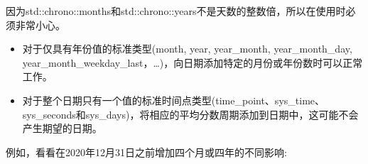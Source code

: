 

因为std::chrono::months和std::chrono::years不是天数的整数倍，所以在使用时必须非常小心。

\begin{itemize}
\item
对于仅具有年份值的标准类型(month, year, year\_month, year\_month\_day, year\_month\_weekday\_last，…)，向日期添加特定的月份或年份数时可以正常工作。

\item
对于整个日期只有一个值的标准时间点类型(time\_point、sys\_time、sys\_seconds和sys\_days)，将相应的平均分数周期添加到日期中，这可能不会产生期望的日期。
\end{itemize}

例如，看看在2020年12月31日之前增加四个月或四年的不同影响:

